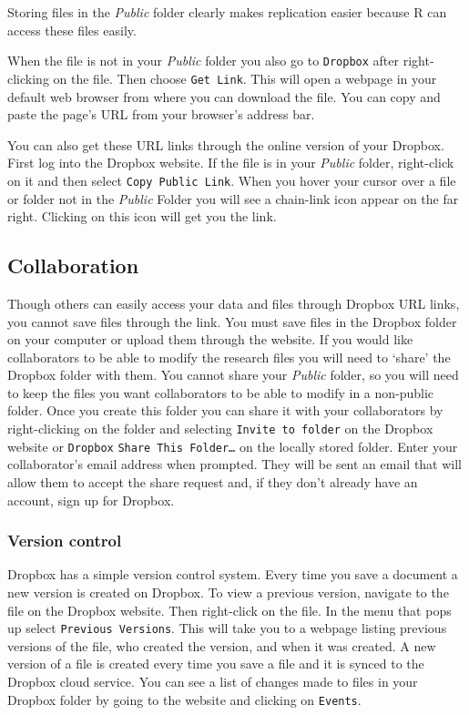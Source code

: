 \noindent Storing files in the \emph{Public} folder clearly makes replication easier because R can access these files easily.

When the file is not in your \emph{Public} folder you also go to \texttt{Dropbox} after right-clicking on the file. Then choose \texttt{Get Link}. This will open a webpage in your default web browser from where you can download the file. You can copy and paste the page's URL from your browser's address bar. 

You can also get these URL links through the online version of your Dropbox. First log into the Dropbox website. If the file is in your \emph{Public} folder, right-click on it and then select \texttt{Copy Public Link}. When you hover your cursor over a file or folder not in the \emph{Public} Folder you will see a chain-link icon appear on the far right. Clicking on this icon will get you the link.

\subsection{Collaboration}

Though others can easily access your data and files through Dropbox URL links, you cannot save files through the link. You must save files in the Dropbox folder on your computer or upload them through the website. If you would like collaborators to be able to modify the research files you will need to `share' the Dropbox folder with them. You cannot share your \emph{Public} folder, so you will need to keep the files you want collaborators to be able to modify in a non-public folder. Once you create this folder you can share it with your collaborators by right-clicking on the folder and selecting \texttt{Invite to folder} on the Dropbox website or \texttt{Dropbox} \textrightarrow\: \texttt{Share This Folder\ldots} on the locally stored folder. Enter your collaborator's email address when prompted. They will be sent an email that will allow them to accept the share request and, if they don't already have an account, sign up for Dropbox.

\subsubsection{Version control}

Dropbox has a simple version control system. Every time you save a document a new version is created on Dropbox. To view a previous version, navigate to the file on the Dropbox website. Then right-click on the file. In the menu that pops up select \texttt{Previous Versions}. This will take you to a webpage listing previous versions of the file, who created the version, and when it was created. A new version of a file is created every time you save a file and it is synced to the Dropbox cloud service. You can see a list of changes made to files in your Dropbox folder by going to the website and clicking on \texttt{Events}.


